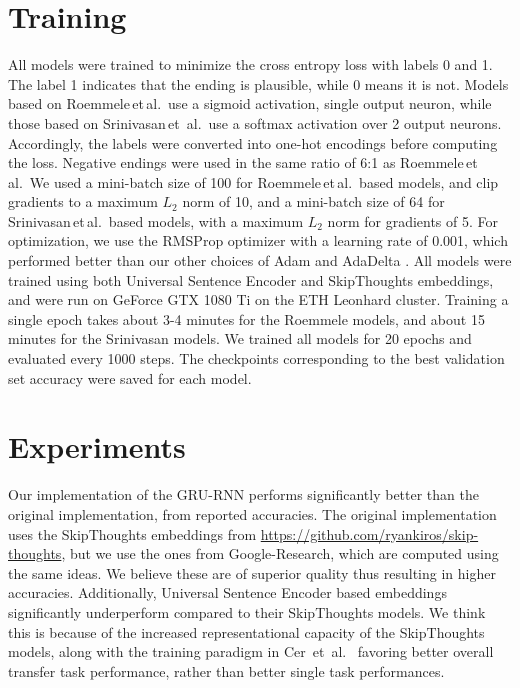 \documentclass{article}
\begin{document}
\section{Training}
All models were trained to minimize the cross entropy loss with labels 0 and 1. The label 1 indicates that the ending is plausible, while 0 means it is not. Models based on Roemmele\,et\,al.\  use a sigmoid activation, single output neuron, while those based on Srinivasan\,et\, al.\ use a softmax activation over 2 output neurons. Accordingly, the labels were converted into one-hot encodings before computing the loss. Negative endings were used in the same ratio of 6:1 as Roemmele\,et\,al.\ We used a mini-batch size of 100 for Roemmele\,et\,al.\ based models, and clip gradients to a maximum $L_2$ norm of 10, and a mini-batch size of 64 for Srinivasan\,et\,al.\ based models, with a maximum $L_2$ norm for gradients of 5. For optimization, we use the RMSProp \citep{HintonNeuralDescent} optimizer with a learning rate of 0.001, which performed better than our other choices of Adam \citep{Kingma2015} and AdaDelta \citep{Zeiler2012ADADELTA:Method}. All models were trained using both Universal Sentence Encoder and SkipThoughts embeddings, and were run on GeForce GTX 1080 Ti on the ETH Leonhard cluster. Training a single epoch takes about 3-4 minutes for the Roemmele models, and about 15 minutes for the Srinivasan models. We trained all models for 20 epochs and evaluated every 1000 steps. The checkpoints corresponding to the best validation set accuracy were saved for each model. 

\section{Experiments}
Our implementation of the GRU-RNN performs significantly better than the original implementation, from reported accuracies. The original implementation uses the SkipThoughts embeddings from \url{https://github.com/ryankiros/skip-thoughts}, but we use the ones from Google-Research, which are computed using the same ideas. We believe these are of superior quality thus resulting in higher accuracies. Additionally, Universal Sentence Encoder based embeddings significantly underperform compared to their SkipThoughts models. We think this is because of the increased representational capacity of the SkipThoughts models, along with the training paradigm in Cer\, et\, al.\ \citep{2018arXiv180311175C} favoring better overall transfer task performance, rather than better single task performances.
\end{document}

